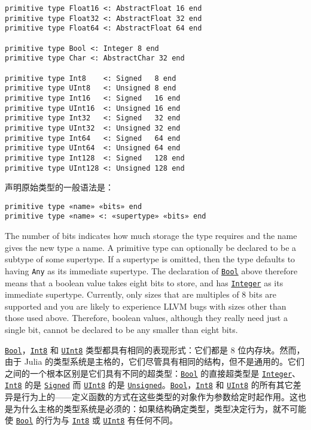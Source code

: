 \begin{verbatim}
primitive type Float16 <: AbstractFloat 16 end
primitive type Float32 <: AbstractFloat 32 end
primitive type Float64 <: AbstractFloat 64 end

primitive type Bool <: Integer 8 end
primitive type Char <: AbstractChar 32 end

primitive type Int8    <: Signed   8 end
primitive type UInt8   <: Unsigned 8 end
primitive type Int16   <: Signed   16 end
primitive type UInt16  <: Unsigned 16 end
primitive type Int32   <: Signed   32 end
primitive type UInt32  <: Unsigned 32 end
primitive type Int64   <: Signed   64 end
primitive type UInt64  <: Unsigned 64 end
primitive type Int128  <: Signed   128 end
primitive type UInt128 <: Unsigned 128 end
\end{verbatim}



声明原始类型的一般语法是：




\begin{lstlisting}
primitive type «name» «bits» end
primitive type «name» <: «supertype» «bits» end
\end{lstlisting}



The number of bits indicates how much storage the type requires and the name gives the new type a name. A primitive type can optionally be declared to be a subtype of some supertype. If a supertype is omitted, then the type defaults to having \texttt{Any} as its immediate supertype. The declaration of \hyperlink{46725311238864537}{\texttt{Bool}} above therefore means that a boolean value takes eight bits to store, and has \hyperlink{8469131683393450448}{\texttt{Integer}} as its immediate supertype. Currently, only sizes that are multiples of 8 bits are supported and you are likely to experience LLVM bugs with sizes other than those used above. Therefore, boolean values, although they really need just a single bit, cannot be declared to be any smaller than eight bits.



\hyperlink{46725311238864537}{\texttt{Bool}}，\hyperlink{5857518405103968275}{\texttt{Int8}} 和 \hyperlink{6609065134969660118}{\texttt{UInt8}} 类型都具有相同的表现形式：它们都是 8 位内存块。然而，由于 Julia 的类型系统是主格的，它们尽管具有相同的结构，但不是通用的。它们之间的一个根本区别是它们具有不同的超类型：\hyperlink{46725311238864537}{\texttt{Bool}} 的直接超类型是 \hyperlink{8469131683393450448}{\texttt{Integer}}、\hyperlink{5857518405103968275}{\texttt{Int8}} 的是 \hyperlink{14154866400772377486}{\texttt{Signed}} 而 \hyperlink{6609065134969660118}{\texttt{UInt8}} 的是 \hyperlink{4780971278803506664}{\texttt{Unsigned}}。\hyperlink{46725311238864537}{\texttt{Bool}}，\hyperlink{5857518405103968275}{\texttt{Int8}} 和 \hyperlink{6609065134969660118}{\texttt{UInt8}} 的所有其它差异是行为上的——定义函数的方式在这些类型的对象作为参数给定时起作用。这也是为什么主格的类型系统是必须的：如果结构确定类型，类型决定行为，就不可能使 \hyperlink{46725311238864537}{\texttt{Bool}} 的行为与 \hyperlink{5857518405103968275}{\texttt{Int8}} 或 \hyperlink{6609065134969660118}{\texttt{UInt8}} 有任何不同。



